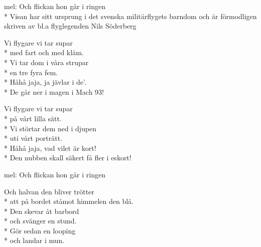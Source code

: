 \begin{SongText}[Flygarsupen]
    \begin{SongInfo}
        mel: Och flickan hon går i ringen\\*%
        Visan har sitt ursprung i det svenska militärflygets barndom och är förmodligen skriven av bl.a flyglegenden Nils Söderberg
    \end{SongInfo}
    \begin{SongVerse}
        Vi flygare vi tar supar\\*%
        med fart och med kläm.\\*%
        Vi tar dom i våra strupar\\*%
        en tre fyra fem.\\*%
        Håhå jaja, ja jävlar i de'.\\*%
        De går ner i magen i Mach 93!
    \end{SongVerse}
    \begin{SongVerse}
        Vi flygare vi tar supar\\*%
        på vårt lilla sätt.\\*%
        Vi störtar dem ned i djupen\\*%
        uti vårt porträtt.\\*%
        Håhå jaja, vad vilet är kort!\\*%
        Den nubben skall säkert få fler i eskort!
    \end{SongVerse}
\end{SongText}
\begin{SongText}[Flygarhalvan]
    \begin{SongInfo}
        mel: Och flickan hon går i ringen
    \end{SongInfo}
    \begin{SongVerse}
        Och halvan den bliver trötter\\*%
        att på bordet ståmot himmelen den blå.\\*%
        Den skevar åt barbord\\*%
        och svänger en stund.\\*%
        Gör sedan en looping\\*%
        och landar i mun.
    \end{SongVerse}
\end{SongText}

